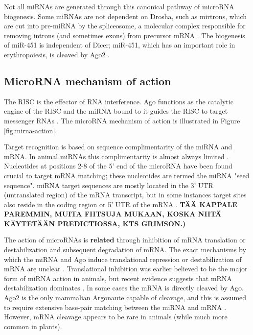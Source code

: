 Not all miRNAs are generated through this canonical pathway of microRNA
biogenesis. Some miRNAs are not dependent on Drosha, such as mirtrons, which
are cut into pre-miRNA by the spliceosome, a molecular complex responsible for
removing introns (and sometimes exons) from precursor mRNA \citep{Ruby2007}. The
biogenesis of miR-451 is independent of Dicer; miR-451, which
has an important role in erythropoiesis, is cleaved by Ago2 \citep{Cheloufi2010}.






\subsection{MicroRNA mechanism of action}\label{microrna-mechanism}

The RISC is the effector of RNA interference. Ago functions as the catalytic
engine of the RISC and the miRNA bound to it guides the RISC to target
messenger RNAs \citep{Filipowicz2008}. The microRNA mechanism of action is
illustrated in Figure \ref{fig:mirna-action}.

Target recognition is based on sequence complimentarity of the miRNA and mRNA.
In animal miRNAs this complimentarity is almost always limited \citep{Ambros2004}.
Nucleotides at positions 2-8 of the 5' end of the microRNA have been found
crucial to target mRNA matching; these nucleotides are termed the miRNA "seed sequence".
miRNA target sequences are mostly located in the 3' UTR (untranslated region)
of the mRNA transcript, but in some instances target sites also reside in the
coding region or 5' UTR of the mRNA \citep{Bartel2009}.
\textbf{TÄÄ KAPPALE PAREMMIN, MUITA FIITSUJA MUKAAN, KOSKA NIITÄ KÄYTETÄÄN PREDICTIOSSA, KTS GRIMSON.)}

The action of microRNAs is \textbf{related} through inhibition of mRNA
translation or destabilization and subsequent degradation of mRNA. The exact
mechanisms by which the miRNA and Ago induce translational repression or
destabilization of mRNA are unclear \citep{Filipowicz2008}. Translational
inhibition was earlier believed to be the major form of miRNA action in animals,
but recent evidence suggests that mRNA destabilization dominates \citep{Guo2010}.
In some cases the mRNA is directly cleaved by Ago. Ago2 is the only mammalian
Argonaute capable of cleavage, and this is assumed to require
extensive base-pair matching between the miRNA and mRNA \citep{Du2005}.
However, mRNA cleavage appears to be rare in animals (while much more common
in plants).

